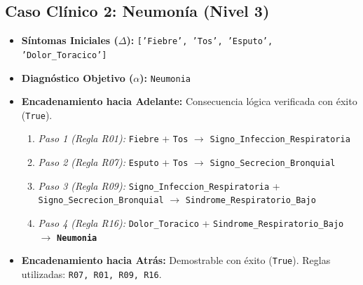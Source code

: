 \documentclass[11pt,a4paper]{article}
\begin{document}
\subsection{Caso Clínico 2: Neumonía (Nivel 3)}
\begin{itemize}
    \item \textbf{Síntomas Iniciales ($\Delta$):} \texttt{['Fiebre', 'Tos', 'Esputo', 'Dolor\_Toracico']}
    \item \textbf{Diagnóstico Objetivo ($\alpha$):} \texttt{Neumonia}
    \item \textbf{Encadenamiento hacia Adelante:} Consecuencia lógica verificada con éxito (\texttt{True}).
    \begin{enumerate}
        \item \textit{Paso 1 (Regla R01):} \texttt{Fiebre} + \texttt{Tos} $\rightarrow$ \texttt{Signo\_Infeccion\_Respiratoria}
        \item \textit{Paso 2 (Regla R07):} \texttt{Esputo} + \texttt{Tos} $\rightarrow$ \texttt{Signo\_Secrecion\_Bronquial}
        \item \textit{Paso 3 (Regla R09):} \texttt{Signo\_Infeccion\_Respiratoria} + \texttt{Signo\_Secrecion\_Bronquial} $\rightarrow$ \texttt{Sindrome\_Respiratorio\_Bajo}
        \item \textit{Paso 4 (Regla R16):} \texttt{Dolor\_Toracico} + \texttt{Sindrome\_Respiratorio\_Bajo} $\rightarrow$ \textbf{\texttt{Neumonia}}
    \end{enumerate}
    \item \textbf{Encadenamiento hacia Atrás:} Demostrable con éxito (\texttt{True}). Reglas utilizadas: \texttt{R07, R01, R09, R16}.
\end{itemize}
\end{document}
